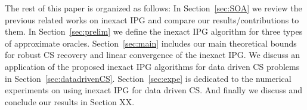The rest of this paper is organized as follows: In Section~\ref{sec:SOA} we review the previous related works on inexact IPG and compare our results/contributions to them. In Section~\ref{sec:prelim} we define the inexact IPG algorithm for three types of approximate oracles. Section~\ref{sec:main} includes our main theoretical bounds for robust CS recovery and linear convergence of the inexact IPG. %
We discuss an application of the proposed inexact IPG algorithms for data driven CS problems in Section~\ref{sec:datadrivenCS}. Section~\ref{sec:expe} is dedicated to the numerical experiments on using inexact IPG for data driven CS. 
And finally we discuss and conclude our results in Section XX\nref.


%











